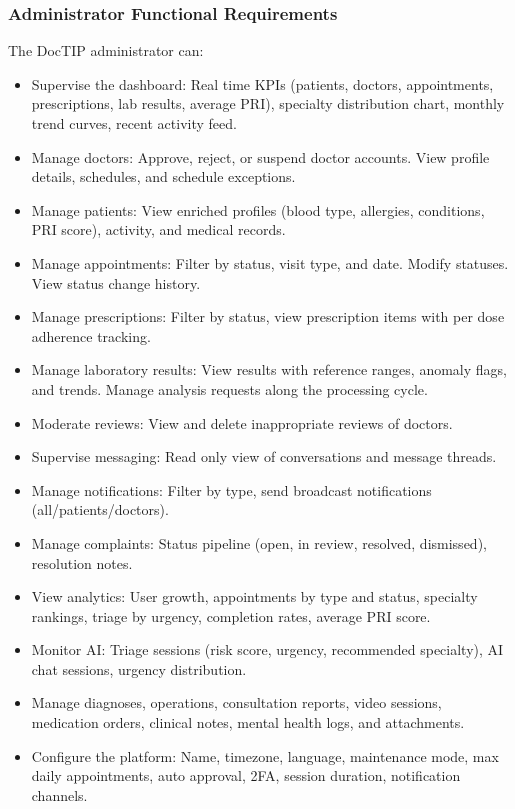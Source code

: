 \documentclass[12pt,a4paper,oneside]{report}
\begin{document}
\subsubsection{Administrator Functional Requirements}

The DocTIP administrator can:

\begin{itemize}
    \item Supervise the dashboard: Real time KPIs (patients, doctors, appointments, prescriptions, lab results, average PRI), specialty distribution chart, monthly trend curves, recent activity feed.
    \item Manage doctors: Approve, reject, or suspend doctor accounts. View profile details, schedules, and schedule exceptions.
    \item Manage patients: View enriched profiles (blood type, allergies, conditions, PRI score), activity, and medical records.
    \item Manage appointments: Filter by status, visit type, and date. Modify statuses. View status change history.
    \item Manage prescriptions: Filter by status, view prescription items with per dose adherence tracking.
    \item Manage laboratory results: View results with reference ranges, anomaly flags, and trends. Manage analysis requests along the processing cycle.
    \item Moderate reviews: View and delete inappropriate reviews of doctors.
    \item Supervise messaging: Read only view of conversations and message threads.
    \item Manage notifications: Filter by type, send broadcast notifications (all/patients/doctors).
    \item Manage complaints: Status pipeline (open, in review, resolved, dismissed), resolution notes.
    \item View analytics: User growth, appointments by type and status, specialty rankings, triage by urgency, completion rates, average PRI score.
    \item Monitor AI: Triage sessions (risk score, urgency, recommended specialty), AI chat sessions, urgency distribution.
    \item Manage diagnoses, operations, consultation reports, video sessions, medication orders, clinical notes, mental health logs, and attachments.
    \item Configure the platform: Name, timezone, language, maintenance mode, max daily appointments, auto approval, 2FA, session duration, notification channels.
\end{itemize}
\end{document}
